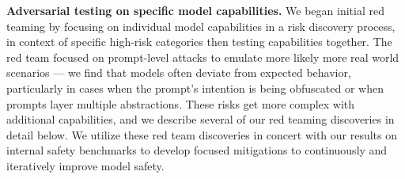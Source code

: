 \textbf{Adversarial testing on specific model capabilities.}
We began initial red teaming by focusing on individual model capabilities in a risk discovery process, in context of specific high-risk categories then testing capabilities together. 
The red team focused on prompt-level attacks to emulate more likely more real world scenarios --- we find that models often deviate from expected behavior, particularly in cases when the prompt's intention is being obfuscated or when prompts layer multiple abstractions.
These risks get more complex with additional capabilities, and we describe several of our red teaming discoveries in detail below.
We utilize these red team discoveries in concert with our results on internal safety benchmarks to develop focused mitigations to continuously and iteratively improve model safety.

